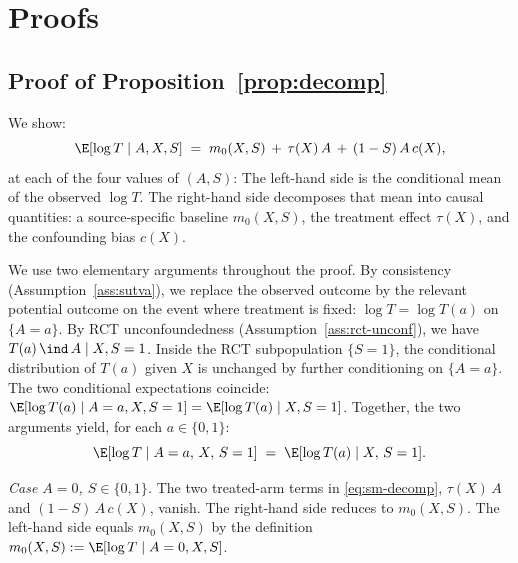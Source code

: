
\section{Proofs}\label{sm:proofs}
\subsection{Proof of Proposition~\ref{prop:decomp}}
We show:
\begin{equation}
\E[\log T \mid A, X, S] \;=\; m_0(X, S) \,+\, \tau(X)\,A \,+\, (1 - S)\,A\,c(X),
\label{eq:sm-decomp}
\end{equation}
at each of the four values of $(A, S)$:
The left-hand side is the conditional mean of the observed $\log T$.
The right-hand side decomposes that mean into causal quantities: a source-specific baseline $m_0(X, S)$, the treatment effect $\tau(X)$, and the confounding bias $c(X)$.

We use two elementary arguments throughout the proof.
By consistency (Assumption~\ref{ass:sutva}), we replace the observed outcome by the relevant potential outcome on the event where treatment is fixed: $\log T = \log T(a)$ on $\{A = a\}$.
By RCT unconfoundedness (Assumption~\ref{ass:rct-unconf}), we have $T(a) \,\ind\, A \mid X, S = 1$.
Inside the RCT subpopulation $\{S = 1\}$, the conditional distribution of $T(a)$ given $X$ is unchanged by further conditioning on $\{A = a\}$.
The two conditional expectations coincide: $\E[\log T(a) \mid A = a, X, S = 1] = \E[\log T(a) \mid X, S = 1]$.
Together, the two arguments yield, for each $a \in \{0, 1\}$:
\begin{equation}
\E[\log T \mid A = a,\, X,\, S = 1] \;=\; \E[\log T(a) \mid X,\, S = 1].
\label{eq:po-step}
\end{equation}

\emph{Case $A = 0$, $S \in \{0, 1\}$.}
The two treated-arm terms in \eqref{eq:sm-decomp}, $\tau(X)\,A$ and $(1 - S)\,A\,c(X)$, vanish.
The right-hand side reduces to $m_0(X, S)$.
The left-hand side equals $m_0(X, S)$ by the definition $m_0(X, S) := \E[\log T \mid A = 0, X, S]$.


